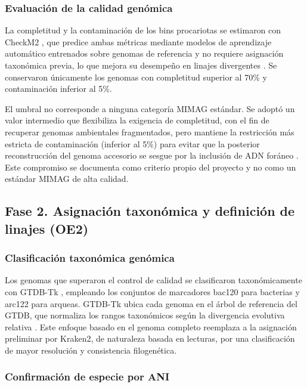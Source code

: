 \subsubsection{Evaluación de la calidad genómica}

La completitud y la contaminación de los bins procariotas se estimaron con CheckM2 \cite{checkm2}, que predice ambas métricas mediante modelos de aprendizaje automático entrenados sobre genomas de referencia y no requiere asignación taxonómica previa, lo que mejora su desempeño en linajes divergentes \cite{checkm2}. Se conservaron únicamente los genomas con completitud superior al 70\% y contaminación inferior al 5\%.

El umbral no corresponde a ninguna categoría MIMAG estándar. Se adoptó un valor intermedio que flexibiliza la exigencia de completitud, con el fin de recuperar genomas ambientales fragmentados, pero mantiene la restricción más estricta de contaminación (inferior al 5\%) para evitar que la posterior reconstrucción del genoma accesorio se sesgue por la inclusión de ADN foráneo \cite{bowers2017}. Este compromiso se documenta como criterio propio del proyecto y no como un estándar MIMAG de alta calidad.

\subsection{Fase 2. Asignación taxonómica y definición de linajes (OE2)}

\subsubsection{Clasificación taxonómica genómica}

Los genomas que superaron el control de calidad se clasificaron taxonómicamente con GTDB-Tk \cite{gtdbtk2019}, empleando los conjuntos de marcadores bac120 para bacterias y arc122 para arqueas. GTDB-Tk ubica cada genoma en el árbol de referencia del GTDB, que normaliza los rangos taxonómicos según la divergencia evolutiva relativa \cite{gtdbtk2019, gtdb2022}. Este enfoque basado en el genoma completo reemplaza a la asignación preliminar por Kraken2, de naturaleza basada en lecturas, por una clasificación de mayor resolución y consistencia filogenética.

\subsubsection{Confirmación de especie por ANI}

